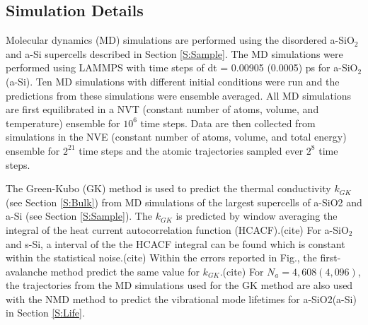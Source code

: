 \documentclass[aps,prb,onecolumn,preprint,superscriptaddress,footinbib,amsmath,amssymb,floatfix]{revtex4}
\begin{document}
\subsection{\label{S:Simulation}Simulation Details}

Molecular dynamics (MD) simulations are performed using the disordered 
a-SiO$_2$ and a-Si supercells described in 
Section \ref{S:Sample}. 
The MD simulations were performed using LAMMPS\cite{plimpton_fast_1995}  
with time steps of dt = 0.00905 (0.0005) ps for a-SiO$_2$(a-Si). 
Ten MD simulations with different initial conditions were run and 
the predictions from these simulations were ensemble averaged. 
All MD simulations are first equilibrated in a NVT (constant number 
of atoms, volume, and temperature) ensemble for $10^6$ 
time steps. Data are then collected from simulations
in the NVE (constant number of atoms, volume, and total
energy) ensemble 
for $2^{21}$ time steps and the atomic trajectories sampled 
ever $2^{8}$ time steps. 

The Green-Kubo (GK) method is used to predict the thermal 
conductivity $k_{GK}$ (see Section \ref{S:Bulk}) from MD simulations 
of the 
largest supercells of a-SiO2 and a-Si (see Section \ref{S:Sample}). The 
$k_{GK}$ is predicted by window averaging the integral of the heat current 
autocorrelation function (HCACF).(cite) 
For a-SiO$_2$ and s-Si, a 
interval of the the HCACF integral can be found which is constant 
within the statistical noise.(cite) Within the errors reported 
in Fig., the first-avalanche method predict the same value for  
$k_{GK}$.(cite)   
For $N_a=4,608 (4,096)$, the trajectories from the MD simulations 
used for the GK method are also used with the NMD method to predict 
the vibrational mode lifetimes for a-SiO2(a-Si) in 
Section \ref{S:Life}. 
\end{document}
